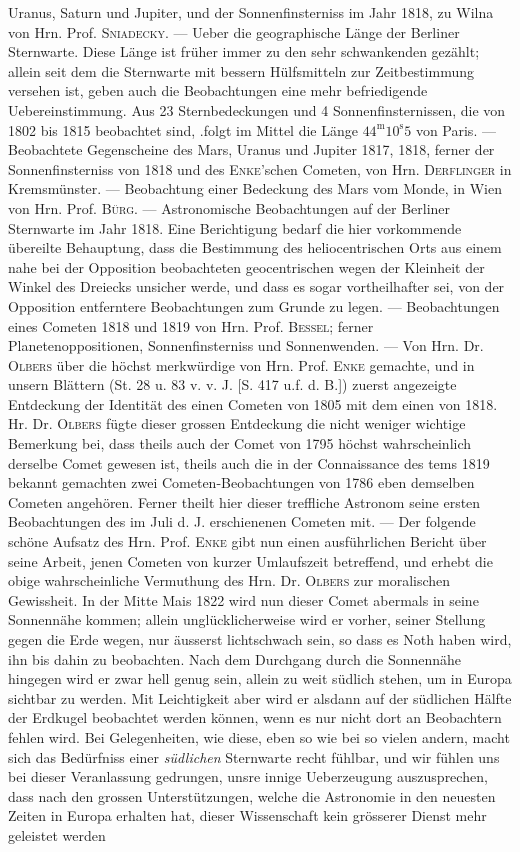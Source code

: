 Uranus, Saturn und Jupiter, und der Sonnenfinsterniss im Jahr 1818, zu Wilna von Hrn. Prof. \textsc{Sniadecky}. --- Ueber die geographische Länge der Berliner Sternwarte. Diese Länge ist früher immer zu den sehr schwankenden gezählt; allein seit dem die Sternwarte mit bessern Hülfsmitteln zur Zeitbestimmung versehen ist, geben auch die Beobachtungen eine mehr befriedigende Uebereinstimmung. Aus 23 Sternbedeckungen und 4 Sonnenfinsternissen, die von 1802 bis 1815 beobachtet sind, .folgt im Mittel die Länge $44^{\mathrm{m}}10^{\mathrm{s}}5$ von Paris. --- Beobachtete Gegenscheine des Mars, Uranus und Jupiter 1817, 1818, ferner der Sonnenfinsterniss von 1818 und des \textsc{Enke}'schen Cometen, von Hrn. \textsc{Derflinger} in Kremsmünster. --- Beobachtung einer Bedeckung des Mars vom Monde, in Wien von Hrn. Prof. \textsc{Bürg}. --- Astronomische Beobachtungen auf der Berliner Sternwarte im Jahr 1818. Eine Berichtigung bedarf die hier vorkommende übereilte Behauptung, dass die Bestimmung des heliocentrischen Orts aus einem nahe bei der Opposition beobachteten geocentrischen wegen der Kleinheit der Winkel des Dreiecks unsicher werde, und dass es sogar vortheilhafter sei, von der Opposition entferntere Beobachtungen zum Grunde zu legen. --- Beobachtungen eines Cometen 1818 und 1819 von Hrn. Prof. \textsc{Bessel}; ferner Planetenoppositionen, Sonnenfinsterniss und Sonnenwenden. --- Von Hrn. Dr. \textsc{Olbers} über die höchst merkwürdige  von Hrn. Prof. \textsc{Enke} gemachte, und in unsern Blättern (St. 28 u. 83 v. v. J. [S. 417 u.f. d. B.]) zuerst angezeigte Entdeckung der Identität des einen Cometen von 1805 mit dem einen von 1818. Hr. Dr. \textsc{Olbers} fügte dieser grossen Entdeckung die nicht weniger wichtige Bemerkung bei, dass theils auch der Comet von 1795 höchst wahrscheinlich derselbe Comet gewesen ist, theils auch die in der Connaissance des tems 1819 bekannt gemachten zwei Cometen-Beobachtungen von 1786 eben demselben Cometen angehören. Ferner theilt hier dieser treffliche Astronom seine ersten Beobachtungen des im Juli d. J. erschienenen Cometen mit. --- Der folgende schöne Aufsatz des Hrn. Prof. \textsc{Enke} gibt nun einen ausführlichen Bericht über seine Arbeit, jenen Cometen von kurzer Umlaufszeit betreffend, und erhebt die obige wahrscheinliche Vermuthung des Hrn. Dr. \textsc{Olbers} zur moralischen Gewissheit. In der Mitte Mais 1822 wird nun dieser Comet abermals in seine Sonnennähe kommen; allein unglücklicherweise wird er vorher, seiner Stellung gegen die Erde wegen, nur äusserst lichtschwach sein, so dass es Noth haben wird, ihn bis dahin zu beobachten. Nach dem Durchgang durch die Sonnennähe hingegen wird er zwar hell genug sein, allein zu weit südlich stehen, um in Europa sichtbar zu werden. Mit Leichtigkeit aber wird er alsdann auf der südlichen Hälfte der Erdkugel beobachtet werden können, wenn es nur nicht dort an Beobachtern fehlen wird. Bei Gelegenheiten, wie diese, eben so wie bei so vielen andern, macht sich das Bedürfniss einer \emph{südlichen} Sternwarte recht fühlbar, und wir fühlen uns bei dieser Veranlassung gedrungen, unsre innige Ueberzeugung auszusprechen, dass nach den grossen Unterstützungen, welche die Astronomie in den neuesten Zeiten in Europa erhalten hat, dieser Wissenschaft kein grösserer Dienst mehr geleistet werden 